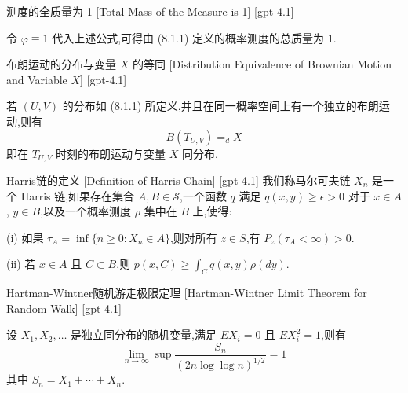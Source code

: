 \documentclass[UTF8]{ctexart}
\begin{document}
    
    
    \begin{ppt}
        {测度的全质量为 1}
        [Total Mass of the Measure is 1]
        [gpt-4.1]
        
令 $\varphi \equiv 1$ 代入上述公式,可得由 (8.1.1) 定义的概率测度的总质量为 1.

    \end{ppt}
    
    
    
    \begin{thm}
        {布朗运动的分布与变量 $X$ 的等同}
        [Distribution Equivalence of Brownian Motion and Variable $X$]
        [gpt-4.1]
        
若 $(U, V)$ 的分布如 (8.1.1) 所定义,并且在同一概率空间上有一个独立的布朗运动,则有
\[
B(T_{U,V}) =_d X
\]
即在 $T_{U,V}$ 时刻的布朗运动与变量 $X$ 同分布.

    \end{thm}
    
    
    
    \begin{dfn}
        {Harris链的定义}
        [Definition of Harris Chain]
        [gpt-4.1]
        我们称马尔可夫链 $X_n$ 是一个 Harris 链,如果存在集合 $A, B \in \mathcal{S}$,一个函数 $q$ 满足 $q(x, y) \geq \epsilon > 0$ 对于 $x \in A$, $y \in B$,以及一个概率测度 $\rho$ 集中在 $B$ 上,使得:

(i) 如果 $\tau_A = \inf \{ n \geq 0 : X_n \in A \}$,则对所有 $z \in S$,有 $P_z(\tau_A < \infty) > 0$.

(ii) 若 $x \in A$ 且 $C \subset B$,则 $p(x, C) \geq \int_C q(x, y) \rho(dy)$.

    \end{dfn}
    
    
    
    \begin{thm}
        {Hartman-Wintner随机游走极限定理}
        [Hartman-Wintner Limit Theorem for Random Walk]
        [gpt-4.1]
        
设 $X_1, X_2, \dots$ 是独立同分布的随机变量,满足 $E X_i = 0$ 且 $E X_i^2 = 1$,则有
\[
\lim_{n \to \infty} \sup \frac{S_n}{(2 n \log \log n)^{1/2}} = 1
\]
其中 $S_n = X_1 + \cdots + X_n$.

    \end{thm}
    
\end{document}
